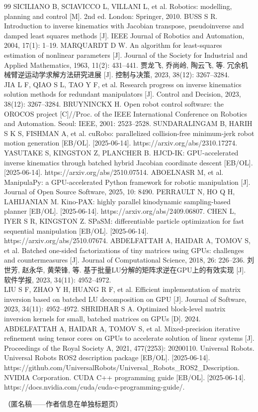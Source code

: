 \documentclass[twocolumn,a4paper,10pt]{ctexart}
\begin{document}
\newpage
\begin{thebibliography}{99}
 SICILIANO B, SCIAVICCO L, VILLANI L, et al. Robotics: modelling, planning and control [M]. 2nd ed. London: Springer, 2010.
 BUSS S R. Introduction to inverse kinematics with Jacobian transpose, pseudoinverse and damped least squares methods [J]. IEEE Journal of Robotics and Automation, 2004, 17(1): 1--19.
 MARQUARDT D W. An algorithm for least-squares estimation of nonlinear parameters [J]. Journal of the Society for Industrial and Applied Mathematics, 1963, 11(2): 431--441.
 贾龙飞, 乔尚岭, 陶云飞, 等. 冗余机械臂逆运动学求解方法研究进展 [J]. 控制与决策, 2023, 38(12): 3267--3284.\\
JIA L F, QIAO S L, TAO Y F, et al. Research progress on inverse kinematics solution methods for redundant manipulators [J]. Control and Decision, 2023, 38(12): 3267--3284.
 BRUYNINCKX H. Open robot control software: the OROCOS project [C]//Proc. of the IEEE International Conference on Robotics and Automation. Seoul: IEEE, 2001: 2523--2528.
 SUNDARALINGAM B, HARIH S K S, FISHMAN A, et al. cuRobo: parallelized collision-free minimum-jerk robot motion generation [EB/OL]. [2025-06-14]. https://arxiv.org/abs/2310.17274.
 YASUTAKE S, KINGSTON Z, PLANCHER B. HJCD-IK: GPU-accelerated inverse kinematics through batched hybrid Jacobian coordinate descent [EB/OL]. [2025-06-14]. https://arxiv.org/abs/2510.07514.
 ABOELNASR M, et al. ManipulaPy: a GPU-accelerated Python framework for robotic manipulation [J]. Journal of Open Source Software, 2025, 10: 8490.
 PERRAULT N, HO Q H, LAHIJANIAN M. Kino-PAX: highly parallel kinodynamic sampling-based planner [EB/OL]. [2025-06-14]. https://arxiv.org/abs/2409.06807.
 CHEN L, IYER S R, KINGSTON Z. SPaSM: differentiable particle optimization for fast sequential manipulation [EB/OL]. [2025-06-14]. https://arxiv.org/abs/2510.07674.
 ABDELFATTAH A, HAIDAR A, TOMOV S, et al. Batched one-sided factorizations of tiny matrices using GPUs: challenges and countermeasures [J]. Journal of Computational Science, 2018, 26: 226--236.
 刘世芳, 赵永华, 黄荣锋, 等. 基于批量LU分解的矩阵求逆在GPU上的有效实现 [J]. 软件学报, 2023, 34(11): 4952--4972.\\
LIU S F, ZHAO Y H, HUANG R F, et al. Efficient implementation of matrix inversion based on batched LU decomposition on GPU [J]. Journal of Software, 2023, 34(11): 4952--4972.
 SHRIDHAR S A. Optimized block-level matrix inversion kernels for small, batched matrices on GPUs [D]. 2024.
 ABDELFATTAH A, HAIDAR A, TOMOV S, et al. Mixed-precision iterative refinement using tensor cores on GPUs to accelerate solution of linear systems [J]. Proceedings of the Royal Society A, 2021, 477(2253): 20200110.
 Universal Robots. Universal Robots ROS2 description package [EB/OL]. [2025-06-14]. https://github.com/UniversalRobots/Universal\_Robots\_ROS2\_Description.
 NVIDIA Corporation. CUDA C++ programming guide [EB/OL]. [2025-06-14]. https://docs.nvidia.com/cuda/cuda-c-programming-guide/.
\end{thebibliography}

\vspace{5mm}

\vspace{2mm}
\noindent （匿名稿——作者信息在单独标题页）\\
\end{document}
